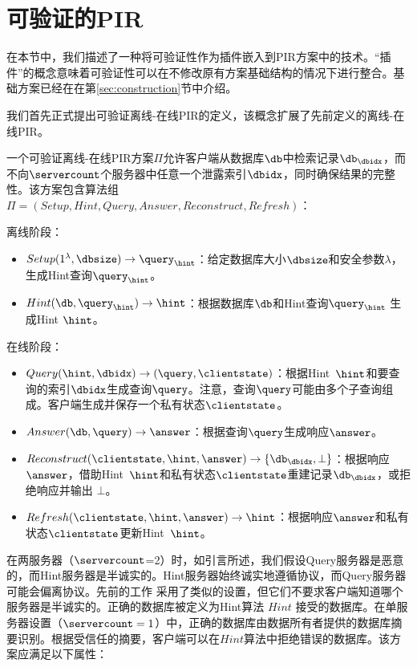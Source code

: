 \section{可验证的PIR}
\label{sec:verification}
在本节中，我们描述了一种将可验证性作为插件嵌入到PIR方案中的技术。“插件”的概念意味着可验证性可以在不修改原有方案基础结构的情况下进行整合。基础方案已经在在第\ref{sec:construction}节中介绍。

我们首先正式提出可验证离线-在线PIR的定义，该概念扩展了先前定义的离线-在线PIR。

\begin{definition}
    一个可验证离线-在线PIR方案$\Pi$允许客户端从数据库$\db$中检索记录$\db_\dbidx$，而不向$\servercount$个服务器中任意一个泄露索引$\dbidx$，同时确保结果的完整性。该方案包含算法组$\Pi = (Setup, Hint, Query, Answer, Reconstruct, Refresh)$：
    \begin{center}
        离线阶段：
        \begin{itemize}[leftmargin=*]
            \item $Setup(1^\lambda,\dbsize) \rightarrow \query_\hint$：给定数据库大小$\dbsize$和安全参数$\lambda$，生成Hint查询$\query_\hint$。
            \item $Hint(\db, \query_\hint) \rightarrow \hint$：根据数据库$\db$和Hint查询$\query_\hint$ 生成Hint $\hint$。
        \end{itemize}
        在线阶段：
        \begin{itemize}
            \item $Query(\hint, \dbidx) \rightarrow (\query, \clientstate)$：根据Hint~$\hint$和要查询的索引$\dbidx$生成查询$\query$。注意，查询$\query$可能由多个子查询组成。客户端生成并保存一个私有状态$\clientstate$。
            \item $Answer(\db, \query) \rightarrow \answer$：根据查询$\query$生成响应$\answer$。
            \item $Reconstruct(\clientstate, \hint, \answer) \rightarrow \{\db_\dbidx, \bot\}$：根据响应$\answer$，借助Hint~$\hint$和私有状态$\clientstate$重建记录$\db_\dbidx$，或拒绝响应并输出 $\bot$。
            \item $Refresh(\clientstate, \hint, \answer) \rightarrow \hint$：根据响应$\answer$和私有状态$\clientstate$更新Hint~$\hint$。
        \end{itemize}
    \end{center}
    在两服务器（$\servercount$=2）时，如引言所述，我们假设Query服务器是恶意的，而Hint服务器是半诚实的。Hint服务器始终诚实地遵循协议，而Query服务器可能会偏离协议。先前的工作 \cite{APIR} 采用了类似的设置，但它们不要求客户端知道哪个服务器是半诚实的。正确的数据库被定义为Hint算法 $Hint$ 接受的数据库。在单服务器设置（$\servercount=1$）中，正确的数据库由数据所有者提供的数据库摘要识别。根据受信任的摘要，客户端可以在$Hint$算法中拒绝错误的数据库。该方案应满足以下属性：


\end{definition}
